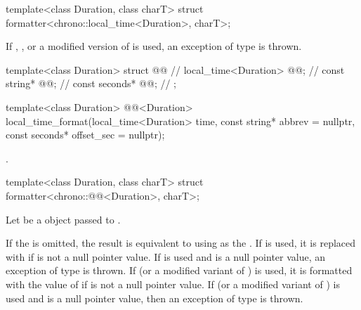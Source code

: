 %
\begin{itemdecl}
template<class Duration, class charT>
  struct formatter<chrono::local_time<Duration>, charT>;
\end{itemdecl}

\begin{itemdescr}
\pnum
\remarks
If , , or a modified version of  is used,
an exception of type  is thrown.
\end{itemdescr}

%
\begin{codeblock}
template<class Duration> struct @@ {           // \expos
  local_time<Duration> @@;                                   // \expos
  const string* @@;                                        // \expos
  const seconds* @@;                                    // \expos
};
\end{codeblock}

%
\begin{itemdecl}
template<class Duration>
  @@<Duration>
    local_time_format(local_time<Duration> time, const string* abbrev = nullptr,
                      const seconds* offset_sec = nullptr);
\end{itemdecl}

\begin{itemdescr}
\pnum
\returns
{}.
\end{itemdescr}

%
\begin{itemdecl}
template<class Duration, class charT>
  struct formatter<chrono::@@<Duration>, charT>;
\end{itemdecl}

\begin{itemdescr}
\pnum
Let  be a  object
passed to .

\pnum
\remarks
If the  is omitted,
the result is equivalent to using  as
the .
If  is used,
it is replaced with 
if  is not a null pointer value.
If  is used
and  is a null pointer value,
an exception of type  is thrown.
If  (or a modified variant of ) is used,
it is formatted with the value of 
if  is not a null pointer value.
If  (or a modified variant of ) is used
and  is a null pointer value,
then an exception of type  is thrown.
\end{itemdescr}

